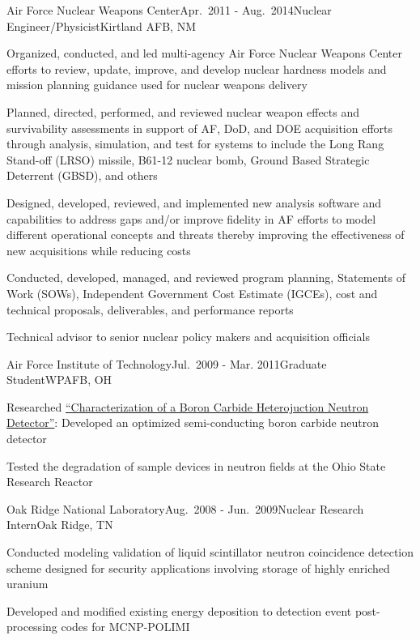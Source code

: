 \begin{rSubsection}{Air Force Nuclear Weapons Center}{Apr.\ 2011 - Aug.\ 2014}{Nuclear Engineer/Physicist}{Kirtland AFB, NM}
\item Organized, conducted, and led multi-agency Air Force Nuclear Weapons Center efforts to review, update, improve, and develop nuclear hardness models and mission planning guidance used for nuclear weapons delivery
\item Planned, directed, performed, and reviewed nuclear weapon effects and survivability assessments in support of AF, DoD, and DOE acquisition efforts through analysis, simulation, and test for systems to include the Long Rang Stand-off (LRSO) missile, B61-12 nuclear bomb, Ground Based Strategic Deterrent (GBSD), and others
\item Designed, developed, reviewed, and implemented new analysis software and capabilities to address gaps and/or improve fidelity in AF efforts to model different operational concepts and threats thereby improving the effectiveness of new acquisitions while reducing costs 
\item Conducted, developed, managed, and reviewed program planning, Statements of Work (SOWs), Independent Government Cost Estimate (IGCEs), cost and technical proposals, deliverables, and performance reports
\item Technical advisor to senior nuclear policy makers and acquisition officials 
\end{rSubsection}

\begin{rSubsection}{Air Force Institute of Technology}{Jul.\ 2009 - Mar. 2011}{Graduate Student}{WPAFB, OH}
\item Researched \href{http://www.dtic.mil/dtic/tr/fulltext/u2/a538569.pdf}{\enquote{Characterization of a Boron Carbide Heterojuction Neutron Detector}}: Developed an optimized semi-conducting boron carbide neutron detector 
\item Tested the degradation of sample devices in neutron fields at the Ohio State Research Reactor
\end{rSubsection}


\begin{rSubsection}{Oak Ridge National Laboratory}{Aug.\ 2008 - Jun.\ 2009}{Nuclear Research Intern}{Oak Ridge, TN}
\item Conducted modeling validation of liquid scintillator neutron coincidence detection scheme designed for security applications involving storage of highly enriched uranium
\item Developed and modified existing energy deposition to detection event post-processing codes for MCNP-POLIMI
\end{rSubsection}

